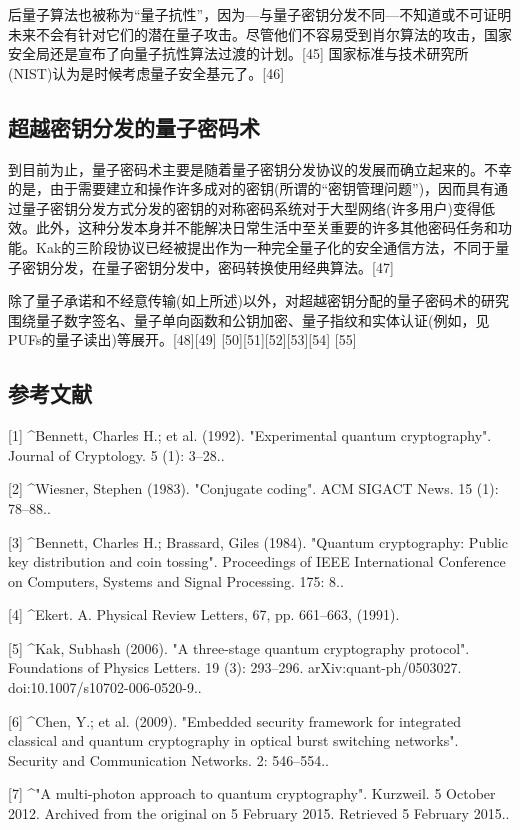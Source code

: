 后量子算法也被称为“量子抗性”，因为—与量子密钥分发不同—不知道或不可证明未来不会有针对它们的潜在量子攻击。尽管他们不容易受到肖尔算法的攻击，国家安全局还是宣布了向量子抗性算法过渡的计划。[45] 国家标准与技术研究所(NIST)认为是时候考虑量子安全基元了。[46]

\subsection{超越密钥分发的量子密码术}
到目前为止，量子密码术主要是随着量子密钥分发协议的发展而确立起来的。不幸的是，由于需要建立和操作许多成对的密钥(所谓的“密钥管理问题”)，因而具有通过量子密钥分发方式分发的密钥的对称密码系统对于大型网络(许多用户)变得低效。此外，这种分发本身并不能解决日常生活中至关重要的许多其他密码任务和功能。Kak的三阶段协议已经被提出作为一种完全量子化的安全通信方法，不同于量子密钥分发，在量子密钥分发中，密码转换使用经典算法。[47]

除了量子承诺和不经意传输(如上所述)以外，对超越密钥分配的量子密码术的研究围绕量子数字签名、量子单向函数和公钥加密、量子指纹和实体认证(例如，见PUFs的量子读出)等展开。[48][49] [50][51][52][53][54] [55]

\subsection{参考文献}
[1]
^Bennett, Charles H.; et al. (1992). "Experimental quantum cryptography". Journal of Cryptology. 5 (1): 3–28..

[2]
^Wiesner, Stephen (1983). "Conjugate coding". ACM SIGACT News. 15 (1): 78–88..

[3]
^Bennett, Charles H.; Brassard, Giles (1984). "Quantum cryptography: Public key distribution and coin tossing". Proceedings of IEEE International Conference on Computers, Systems and Signal Processing. 175: 8..

[4]
^Ekert. A. Physical Review Letters, 67, pp. 661–663, (1991).

[5]
^Kak, Subhash (2006). "A three-stage quantum cryptography protocol". Foundations of Physics Letters. 19 (3): 293–296. arXiv:quant-ph/0503027. doi:10.1007/s10702-006-0520-9..

[6]
^Chen, Y.; et al. (2009). "Embedded security framework for integrated classical and quantum cryptography in optical burst switching networks". Security and Communication Networks. 2: 546–554..

[7]
^"A multi-photon approach to quantum cryptography". Kurzweil. 5 October 2012. Archived from the original on 5 February 2015. Retrieved 5 February 2015..

